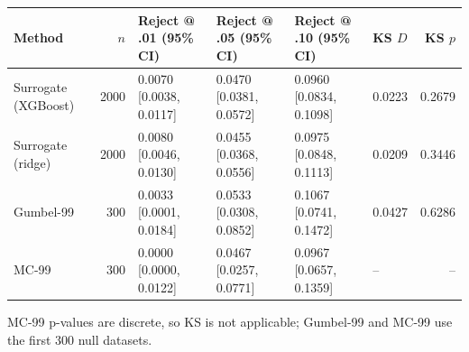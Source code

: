 \begin{tabular}{lrllllr}
\toprule
Method & $n$ & Reject @ .01 (95\% CI) & Reject @ .05 (95\% CI) & Reject @ .10 (95\% CI) & KS $D$ & KS $p$ \\
\midrule
Surrogate (XGBoost) & 2000 & 0.0070 [0.0038, 0.0117] & 0.0470 [0.0381, 0.0572] & 0.0960 [0.0834, 0.1098] & 0.0223 & 0.2679 \\
Surrogate (ridge) & 2000 & 0.0080 [0.0046, 0.0130] & 0.0455 [0.0368, 0.0556] & 0.0975 [0.0848, 0.1113] & 0.0209 & 0.3446 \\
Gumbel-99 & 300 & 0.0033 [0.0001, 0.0184] & 0.0533 [0.0308, 0.0852] & 0.1067 [0.0741, 0.1472] & 0.0427 & 0.6286 \\
MC-99 & 300 & 0.0000 [0.0000, 0.0122] & 0.0467 [0.0257, 0.0771] & 0.0967 [0.0657, 0.1359] & -- & -- \\
\bottomrule
\end{tabular}
\footnotesize{MC-99 p-values are discrete, so KS is not applicable; Gumbel-99 and MC-99 use the first 300 null datasets.}
